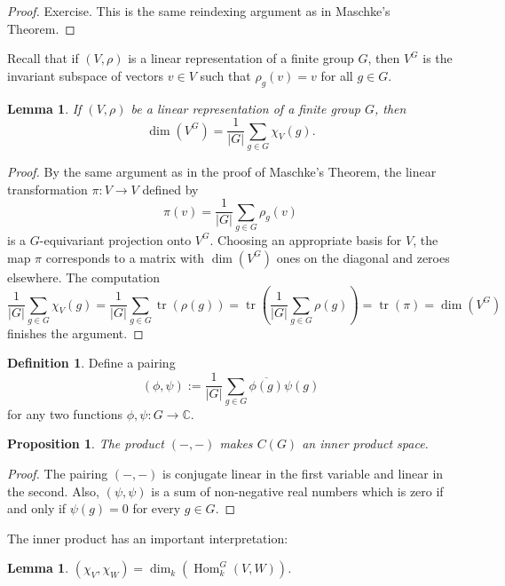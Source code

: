 \documentclass[12pt]{article}
\theoremstyle{plain}
\newtheorem{lemma}[theorem]{Lemma}
\newtheorem{proposition}[theorem]{Proposition}
\theoremstyle{definition}
\newtheorem{definition}[theorem]{Definition}
\theoremstyle{remark}
\numberwithin{equation}{section}
\begin{document}
\begin{proof}
Exercise.  This is the same reindexing argument as in Maschke's Theorem.
\end{proof}

Recall that if $(V,\rho)$ is a linear representation of a finite group $G$,
then $V^G$ is the invariant subspace of vectors
$v \in V$ such that $\rho_g(v)=v$ for all $g \in G$.

\begin{lemma} \label{lem:proj_onto_invariants}
If $(V,\rho)$ be a linear representation of a finite group $G$,
then
\[ \dim(V^G) = \frac{1}{|G|} \sum_{g \in G} \chi_V(g). \]
\end{lemma}

\begin{proof}
By the same argument as in the proof of Maschke's Theorem,
the linear transformation $\pi : V \to V$ defined by
\[
\pi(v) = \frac{1}{|G|} \sum_{g \in G} \rho_g(v)
\]
is a $G$-equivariant projection onto $V^G$.
Choosing an appropriate basis for $V$, the map $\pi$ corresponds to a
matrix with $\dim(V^G)$ ones on the diagonal and zeroes elsewhere.
The computation
\[
\frac{1}{|G|} \sum_{g \in G} \chi_V(g)
= \frac{1}{|G|} \sum_{g \in G} \operatorname{tr}( \rho(g) )
= \operatorname{tr}\left( \frac{1}{|G|} \sum_{g \in G}\rho(g) \right)
= \operatorname{tr}( \pi ) = \dim(V^G)
\]
finishes the argument.
\end{proof}

\begin{definition} \label{def:innerProduct}
Define a pairing
\[
( \phi , \psi ) := \frac{1}{|G|}
\sum_{g \in G} \overline{\phi(g)} \psi(g)
\]
for any two functions $\phi, \psi : G \to \mathbb{C}$.
\end{definition}

\begin{proposition}
The product $(-,-)$ makes $C(G)$ an inner product space.
\end{proposition}

\begin{proof}
The pairing $(-,-)$ is conjugate linear in the first variable and linear in
the second.  Also, $(\psi,\psi)$ is a sum of non-negative real numbers
which is zero if and only if $\psi(g)=0$ for every $g \in G$.
\end{proof}


The inner product has an important interpretation:

\begin{lemma}
$\displaystyle
(\chi_V, \chi_W) = \dim_k\left( \operatorname{Hom}^G_k\left(V,
W\right)\right)$.
\end{lemma}
\end{document}
